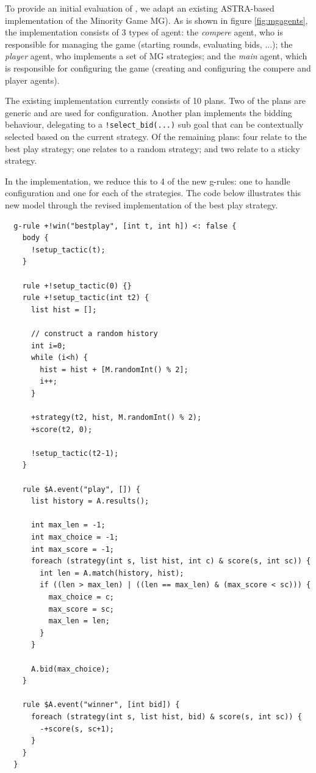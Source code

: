 To provide an initial evaluation of {\aser}, we adapt an existing ASTRA-based implementation of 
the Minority Game MG). As is shown in figure \ref{fig:mgagents}, the implementation consists of
3 types of agent: the \emph{compere} agent, who is responsible for managing the game (starting 
rounds, evaluating bids, ...); the \emph{player} agent, who implements a set of MG strategies; 
and the \emph{main} agent, which is responsible for configuring the game (creating and configuring
the compere and player agents).

The existing implementation currently consists of 10 plans. Two of the plans are generic and are
used for configuration. Another plan implements the bidding behaviour, delegating to a 
\verb|!select_bid(...)| sub goal that can be contextually selected based on the current strategy.
Of the remaining plans: four relate to the best play strategy; one relates to a random strategy;
and two relate to a sticky strategy.

In the {\aser} implementation, we reduce this to 4 of the new g-rules: one to handle configuration
and one for each of the strategies. The code below illustrates this new model through the
revised implementation of the best play strategy.

{\small
\begin{verbatim}
  g-rule +!win("bestplay", [int t, int h]) <: false {
    body {
      !setup_tactic(t);
    }

    rule +!setup_tactic(0) {}
    rule +!setup_tactic(int t2) {
      list hist = [];
			
      // construct a random history
      int i=0;
      while (i<h) {
        hist = hist + [M.randomInt() % 2];
        i++;
      }
			
      +strategy(t2, hist, M.randomInt() % 2);
      +score(t2, 0);
		
      !setup_tactic(t2-1);
    }
		
    rule $A.event("play", []) { 
      list history = A.results();
			
      int max_len = -1;
	  int max_choice = -1;
	  int max_score = -1;
	  foreach (strategy(int s, list hist, int c) & score(s, int sc)) {
	    int len = A.match(history, hist);
        if ((len > max_len) | ((len == max_len) & (max_score < sc))) {
          max_choice = c;
          max_score = sc;
          max_len = len;
        }
      }
		
      A.bid(max_choice);
    }
		
    rule $A.event("winner", [int bid]) {
	  foreach (strategy(int s, list hist, bid) & score(s, int sc)) {
        -+score(s, sc+1);
      }
    }
  }
\end{verbatim}}

